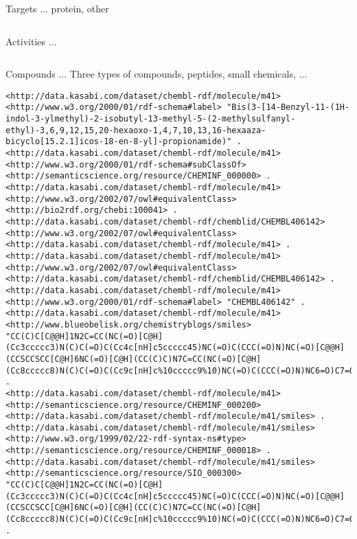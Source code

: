 \documentclass[sw]{iosart2c}
\begin{document}
Targets ... protein, other

\begin{verbatim}
\end{verbatim}

Activities ...

\begin{verbatim}
\end{verbatim}

Compounds ... Three types of compounds, peptides, small chemicals, ...

\begin{tiny}
\begin{verbatim}
<http://data.kasabi.com/dataset/chembl-rdf/molecule/m41> <http://www.w3.org/2000/01/rdf-schema#label> "Bis(3-[14-Benzyl-11-(1H-indol-3-ylmethyl)-2-isobutyl-13-methyl-5-(2-methylsulfanyl-ethyl)-3,6,9,12,15,20-hexaoxo-1,4,7,10,13,16-hexaaza-bicyclo[15.2.1]icos-18-en-8-yl]-propionamide)" .
<http://data.kasabi.com/dataset/chembl-rdf/molecule/m41> <http://www.w3.org/2000/01/rdf-schema#subClassOf> <http://semanticscience.org/resource/CHEMINF_000000> .
<http://data.kasabi.com/dataset/chembl-rdf/molecule/m41> <http://www.w3.org/2002/07/owl#equivalentClass> <http://bio2rdf.org/chebi:100041> .
<http://data.kasabi.com/dataset/chembl-rdf/chemblid/CHEMBL406142> <http://www.w3.org/2002/07/owl#equivalentClass> <http://data.kasabi.com/dataset/chembl-rdf/molecule/m41> .
<http://data.kasabi.com/dataset/chembl-rdf/molecule/m41> <http://www.w3.org/2002/07/owl#equivalentClass> <http://data.kasabi.com/dataset/chembl-rdf/chemblid/CHEMBL406142> .
<http://data.kasabi.com/dataset/chembl-rdf/molecule/m41> <http://www.w3.org/2000/01/rdf-schema#label> "CHEMBL406142" .
<http://data.kasabi.com/dataset/chembl-rdf/molecule/m41> <http://www.blueobelisk.org/chemistryblogs/smiles> "CC(C)C[C@@H]1N2C=CC(NC(=O)[C@H](Cc3ccccc3)N(C)C(=O)C(Cc4c[nH]c5ccccc45)NC(=O)C(CCC(=O)N)NC(=O)[C@@H](CCSCCSCC[C@H]6NC(=O)[C@H](CC(C)C)N7C=CC(NC(=O)[C@H](Cc8ccccc8)N(C)C(=O)C(Cc9c[nH]c%10ccccc9%10)NC(=O)C(CCC(=O)N)NC6=O)C7=O)NC1=O)C2=O" .
<http://data.kasabi.com/dataset/chembl-rdf/molecule/m41> <http://semanticscience.org/resource/CHEMINF_000200> <http://data.kasabi.com/dataset/chembl-rdf/molecule/m41/smiles> .
<http://data.kasabi.com/dataset/chembl-rdf/molecule/m41/smiles> <http://www.w3.org/1999/02/22-rdf-syntax-ns#type> <http://semanticscience.org/resource/CHEMINF_000018> .
<http://data.kasabi.com/dataset/chembl-rdf/molecule/m41/smiles> <http://semanticscience.org/resource/SIO_000300> "CC(C)C[C@@H]1N2C=CC(NC(=O)[C@H](Cc3ccccc3)N(C)C(=O)C(Cc4c[nH]c5ccccc45)NC(=O)C(CCC(=O)N)NC(=O)[C@@H](CCSCCSCC[C@H]6NC(=O)[C@H](CC(C)C)N7C=CC(NC(=O)[C@H](Cc8ccccc8)N(C)C(=O)C(Cc9c[nH]c%10ccccc9%10)NC(=O)C(CCC(=O)N)NC6=O)C7=O)NC1=O)C2=O" .

\end{verbatim}
\end{tiny}
\end{document}
